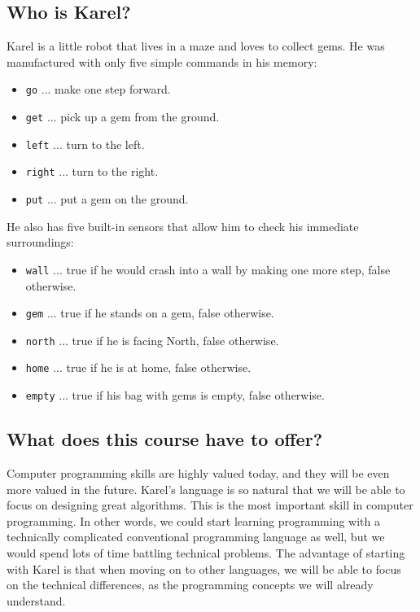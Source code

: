 \documentclass[article,A4,12pt]{llncs}
\begin{document}
\subsection{Who is Karel?}

Karel is a little robot that lives in a maze and loves to collect gems.
He was manufactured with only five simple commands in his memory:
\begin{itemize}
\item {\color{blue} \tt go} ... make one step forward.
\item {\color{blue} \tt get} ... pick up a gem from the ground. 
\item {\color{blue} \tt left} ... turn to the left.
\item {\color{blue} \tt right} ... turn to the right. 
\item {\color{blue} \tt put} ... put a gem on the ground. 
\end{itemize}
He also has five built-in sensors that allow him to check his immediate surroundings:
\begin{itemize}
\item {\color{blue} \tt wall} ... true if he would crash into a wall by making one more step, false otherwise. 
\item {\color{blue} \tt gem} ... true if he stands on a gem, false otherwise.
\item {\color{blue} \tt north} ... true if he is facing North, false otherwise.
\item {\color{blue} \tt home} ... true if he is at home, false otherwise.
\item {\color{blue} \tt empty} ... true if his bag with gems is empty, false otherwise. 
\end{itemize}

\subsection{What does this course have to offer?}

Computer programming skills are highly valued today, and they will be even more 
valued in the future. Karel's language is so natural that we will be able to 
focus on designing great algorithms. This is the most important skill in 
computer programming. In other words, we could start learning programming 
with a technically 
complicated conventional programming language as well, but we would spend lots of time 
battling technical problems. The advantage of starting with Karel is that 
when moving on to other languages, we will be able to focus on the technical 
differences, as the programming concepts we will already understand.
\end{document}
